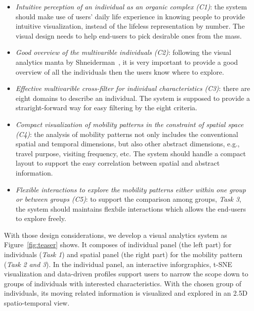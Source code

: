 \begin{itemize}
\item \textit{Intuitive perception of an individual as an organic complex (C1)}: the system should make use of users' daily life experience in knowing people to provide intuitive visualization, instead of the lifeless representation by number. The visual design needs to help end-users to pick desirable ones from the mass. 
\item \textit{Good overview of the multivarible individuals (C2)}: following the visual analytics manta by Shneiderman~\cite{RN459}, it is very important to provide a good overview of all the individuals then the users know where to explore. 
\item \textit{Effective multivarible cross-filter for individual characteristics (C3)}: there are eight domains to describe an individual. The system is supposed to provide a straright-forward way for easy filtering by the eight criteria. 
\item \textit{Compact visualization of mobility patterns in the constraint of spatial space (C4)}: the analysis of mobility patterns not only includes the conventional spatial and temporal dimensions, but also other abstract dimensions, e.g., travel purpose, visiting frequency, etc. The system should handle a compact layout to support the easy correlation between spatial and abstract information. 
\item \textit{Flexible interactions to explore the mobility patterns either within one group or between groups (C5)}: to support the comparison among groups, \textit{Task 3}, the system should maintains flexbile interactions which allows the end-users to explore freely.
\end{itemize}


With those design considerations, we develop a visual analytics system as Figure~\ref{fig:teaser} shows. It composes of individual panel (the left part) for individuals (\textit{Task 1}) and spatial panel (the right part) for the mobility pattern (\textit{Task 2 and 3}). In the individual panel, an interactive inforgraphics, t-SNE visualization and data-driven profiles support users to narrow the scope down to groups of individuals with interested characteristics. With the chosen group of individuals, its moving related information is visualized and explored in an 2.5D spatio-temporal view.



